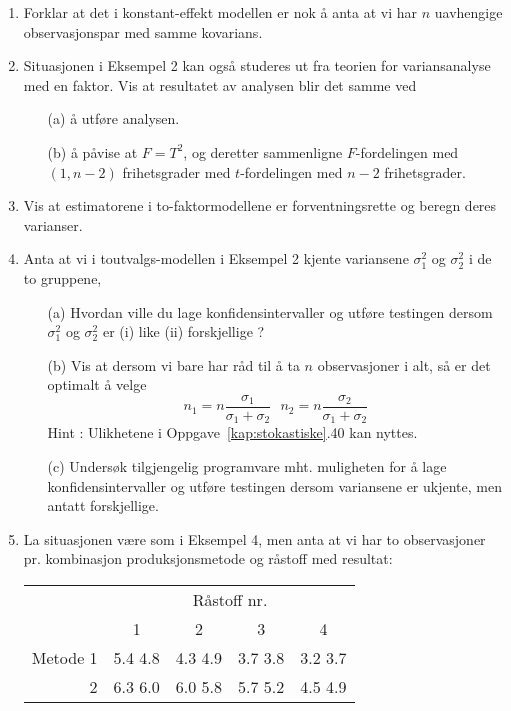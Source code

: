 \begin{enumerate}
\item Forklar at det i konstant-effekt modellen er nok å anta at vi har
      $n$  uavhengige observasjonspar med samme kovarians.
\item Situasjonen i Eksempel 2 kan også studeres ut fra teorien for
      variansanalyse med en faktor. Vis at resultatet av analysen blir det
      samme ved
\begin{itemize}
\item[(a)] å utføre analysen.
\item[(b)] å påvise at $F=T^2$, og deretter sammenligne $F$-fordelingen
           med $(1,n-2)$ frihetsgrader med $t$-fordelingen med $n-2$
          frihetsgrader.
\end{itemize}
\item Vis at estimatorene i to-faktormodellene er forventningsrette og beregn
      deres varianser.
\item Anta at vi i toutvalgs-modellen i Eksempel 2 kjente variansene
      ${\sigma}_1^2$ og ${\sigma}_2^2$ i de to gruppene,
\begin{itemize}
\item[(a)] Hvordan ville du lage konfidensintervaller og utføre testingen
      dersom ${\sigma}_1^2$ og ${\sigma}_2^2$ er (i) like (ii) forskjellige ?
\item[(b)] Vis at dersom vi bare har råd til å ta $n$ observasjoner
          i alt, så er det optimalt å velge 
     \[ n_1=n\frac{{\sigma}_1}{{\sigma}_1+{\sigma}_2} \mbox{\ \ \ \ }
                 n_2=n\frac{{\sigma}_2}{{\sigma}_1+{\sigma}_2}      \]
	Hint : Ulikhetene i Oppgave~\ref*{kap:stokastiske}.40 kan nyttes.
\item[(c)] Undersøk tilgjengelig programvare mht. muligheten for å lage
       konfidensintervaller og utføre testingen dersom variansene er
      ukjente, men antatt forskjellige.
\end{itemize}
\item
La situasjonen være som i Eksempel 4, men anta at vi har to observasjoner
pr. kombinasjon produksjonsmetode og råstoff med resultat:
\begin{center}
\begin{tabular}{|r|cccc|} \cline{2-5}
\multicolumn{1}{c|}{}   &\multicolumn{4}{c|}{Råstoff nr.}  \\
\multicolumn{1}{c|}{}   &    1    &    2    &    3    &    4   \\ \hline 
Metode 1  & 5.4 4.8 & 4.3 4.9 & 3.7 3.8 & 3.2 3.7  \\
       2  & 6.3 6.0 & 6.0 5.8 & 5.7 5.2 & 4.5 4.9  \\

\end{tabular}
\end{center}
\end{enumerate}
